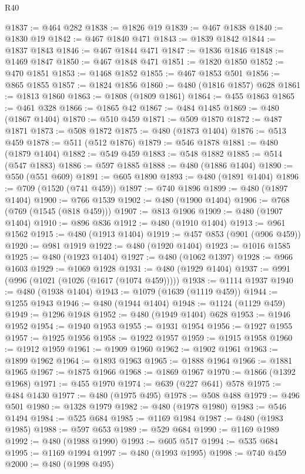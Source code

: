 \begin{lexlean}{R40}
\begin{coremodule}
@1837 := @464 @282
@1838 := @1826 @19
@1839 := @467 @1838
@1840 := @1830 @19
@1842 := @467 @1840 @471
@1843 := @1839 @1842
@1844 := @1837 @1843
@1846 := @467 @1844 @471
@1847 := @1836 @1846
@1848 := @1469 @1847
@1850 := @467 @1848 @471
@1851 := @1820 @1850
@1852 := @470 @1851
@1853 := @1468 @1852
@1855 := @467 @1853 @501
@1856 := @865 @1855
@1857 := @1824 @1856
@1860 := @480 (@1816 @1857) @628
@1861 := @1813 @1860
@1863 := @1808 (@1809 @1861)
@1864 := @455 @1863
@1865 := @461 @328
@1866 := @1865 @42
@1867 := @484 @1485
@1869 := @480 (@1867 @1404)
@1870 := @510 @459
@1871 := @509 @1870
@1872 := @487 @1871
@1873 := @508 @1872
@1875 := @480 (@1873 @1404)
@1876 := @513 @459
@1878 := @511 (@512 @1876)
@1879 := @546 @1878
@1881 := @480 (@1879 @1404)
@1882 := @549 @459
@1883 := @548 @1882
@1885 := @514 (@547 @1883)
@1886 := @597 @1885
@1888 := @480 (@1886 @1404)
@1890 := @550 (@551 @609)
@1891 := @605 @1890
@1893 := @480 (@1891 @1404)
@1896 := @709 (@1520 (@741 @459))
@1897 := @740 @1896
@1899 := @480 (@1897 @1404)
@1900 := @766 @1539
@1902 := @480 (@1900 @1404)
@1906 := @768 (@769 (@1545 (@818 @459)))
@1907 := @813 @1906
@1909 := @480 (@1907 @1404)
@1910 := @896 @836
@1912 := @480 (@1910 @1404)
@1913 := @961 @1562
@1915 := @480 (@1913 @1404)
@1919 := @457 @853 (@901 (@906 @459))
@1920 := @981 @1919
@1922 := @480 (@1920 @1404)
@1923 := @1016 @1585
@1925 := @480 (@1923 @1404)
@1927 := @480 (@1062 @1397)
@1928 := @966 @1603
@1929 := @1069 @1928
@1931 := @480 (@1929 @1404)
@1937 := @991 (@996 (@1021 (@1026 (@1617 (@1074 @459)))))
@1938 := @1114 @1937
@1940 := @480 (@1938 @1404)
@1943 := @1079 (@1639 (@1119 @459))
@1944 := @1255 @1943
@1946 := @480 (@1944 @1404)
@1948 := @1124 (@1129 @459)
@1949 := @1296 @1948
@1952 := @480 (@1949 @1404) @628
@1953 := @1946 @1952
@1954 := @1940 @1953
@1955 := @1931 @1954
@1956 := @1927 @1955
@1957 := @1925 @1956
@1958 := @1922 @1957
@1959 := @1915 @1958
@1960 := @1912 @1959
@1961 := @1909 @1960
@1962 := @1902 @1961
@1963 := @1899 @1962
@1964 := @1893 @1963
@1965 := @1888 @1964
@1966 := @1881 @1965
@1967 := @1875 @1966
@1968 := @1869 @1967
@1970 := @1866 (@1392 @1968)
@1971 := @455 @1970
@1974 := @639 (@227 @641) @578
@1975 := @484 @1430
@1977 := @480 (@1975 @495)
@1978 := @508 @488
@1979 := @496 @501
@1980 := @1328 @1979
@1982 := @480 (@1978 @1980)
@1983 := @546 @1494
@1984 := @525 @684
@1985 := @1169 @1984
@1987 := @480 (@1983 @1985)
@1988 := @597 @653
@1989 := @529 @684
@1990 := @1169 @1989
@1992 := @480 (@1988 @1990)
@1993 := @605 @517
@1994 := @535 @684
@1995 := @1169 @1994
@1997 := @480 (@1993 @1995)
@1998 := @740 @459
@2000 := @480 (@1998 @495)

\end{coremodule}
\end{lexlean}
